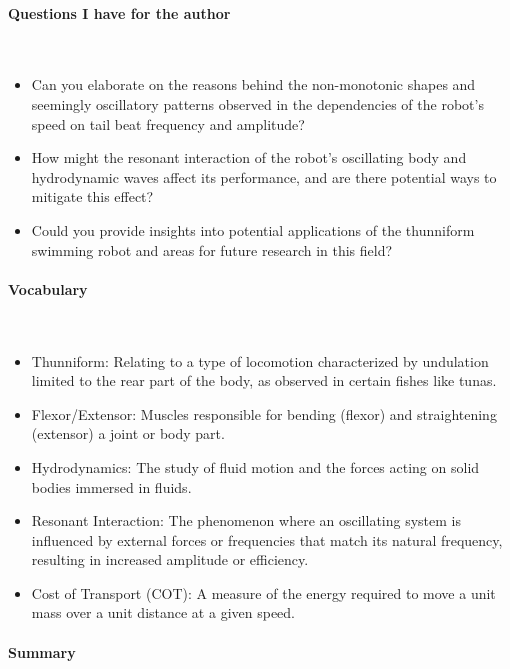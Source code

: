 \vspace*{-0.5cm}
\paragraph{Questions I have for the author} \ 

\begin{itemize}
    \item Can you elaborate on the reasons behind the non-monotonic shapes and seemingly oscillatory patterns observed in the dependencies of the robot's speed on tail beat frequency and amplitude?
    \item How might the resonant interaction of the robot's oscillating body and hydrodynamic waves affect its performance, and are there potential ways to mitigate this effect?
    \item Could you provide insights into potential applications of the thunniform swimming robot and areas for future research in this field? 
\end{itemize}

\vspace{-0.5cm}
\paragraph{Vocabulary} \ 

\begin{itemize}
\item Thunniform: Relating to a type of locomotion characterized by undulation limited to the rear part of the body, as observed in certain fishes like tunas.
\item Flexor/Extensor: Muscles responsible for bending (flexor) and straightening (extensor) a joint or body part.
\item Hydrodynamics: The study of fluid motion and the forces acting on solid bodies immersed in fluids.
\item Resonant Interaction: The phenomenon where an oscillating system is influenced by external forces or frequencies that match its natural frequency, resulting in increased amplitude or efficiency.
\item Cost of Transport (COT): A measure of the energy required to move a unit mass over a unit distance at a given speed.
\end{itemize}

\vspace*{-0.5cm}
\paragraph{Summary} \

